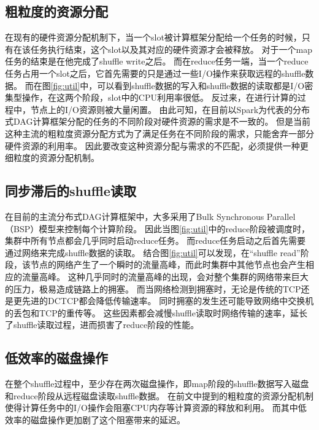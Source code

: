 \subsection{粗粒度的资源分配}

在现有的硬件资源分配机制下，当一个slot被计算框架分配给一个任务的时候，只有在该任务执行结束，这个slot以及其对应的硬件资源才会被释放。
对于一个map任务的结束是在他完成了shuffle write之后。
而在reduce任务一端，当一个reduce任务占用一个slot之后，它首先需要的只是通过一些I/O操作来获取远程的shuffle数据。
而在图\ref{fig:util}中，可以看到shuffle数据的写入和shuffle数据的读取都是I/O密集型操作，在这两个阶段，slot中的CPU利用率很低。
反过来，在进行计算的过程中，节点上的I/O资源则被大量闲置。
由此可知，在目前以Spark为代表的分布式DAG计算框架分配的任务的不同阶段对硬件资源的需求是不一致的。
但是当前这种主流的粗粒度资源分配方式为了满足任务在不同阶段的需求，只能舍弃一部分硬件资源的利用率。
因此要改变这种资源分配与需求的不匹配，必须提供一种更细粒度的资源分配机制。

\subsection{同步滞后的shuffle读取}

在目前的主流分布式DAG计算框架中，大多采用了Bulk Synchronous Parallel（BSP）模型来控制每个计算阶段。
因此当图\ref{fig:util}中的reduce阶段被调度时，集群中所有节点都会几乎同时启动reduce任务。
而reduce任务启动之后首先需要通过网络来完成shuffle数据的读取。
结合图\ref{fig:util}可以发现，在“shuffle read”阶段，该节点的网络产生了一个瞬时的流量高峰，而此时集群中其他节点也会产生相应的流量高峰。
这种几乎同时的流量高峰的出现，会对整个集群的网络带来巨大的压力，极易造成链路上的拥塞。
而当网络检测到拥塞时，无论是传统的TCP\cite{tcp}还是更先进的DCTCP\cite{dctcp}都会降低传输速率。
同时拥塞的发生还可能导致网络中交换机的丢包和TCP的重传等。
这些因素都会减慢shuffle读取时网络传输的速率，延长了shuffle读取过程，进而损害了reduce阶段的性能。

\subsection{低效率的磁盘操作}
\label{subsec:size}

在整个shuffle过程中，至少存在两次磁盘操作，即map阶段的shuffle数据写入磁盘和reduce阶段从远程磁盘读取shuffle数据。
在前文中提到的粗粒度的资源分配机制使得计算任务中的I/O操作会阻塞CPU内存等计算资源的释放和利用。
而其中低效率的磁盘操作更加剧了这个阻塞带来的延迟。

